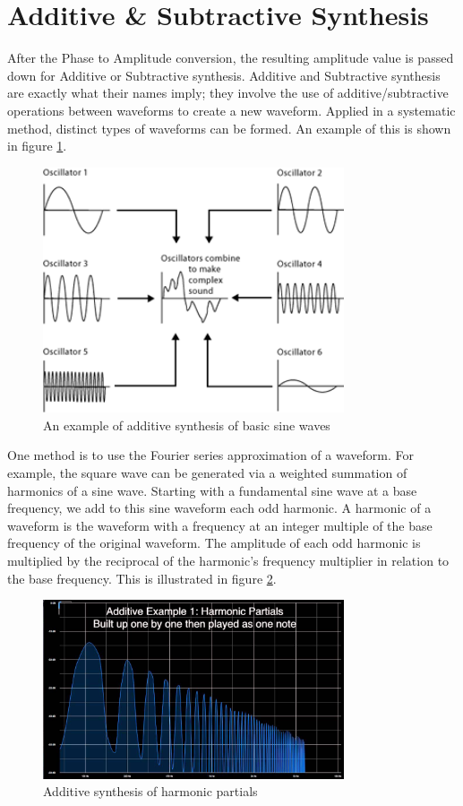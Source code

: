\documentclass[a4paper,12pt]{report}
\begin{document}
\section{Additive \& Subtractive Synthesis}
\label{sec:addsubsynthesis}
After the Phase to Amplitude conversion, the resulting amplitude value is passed down for Additive or Subtractive synthesis. Additive and Subtractive synthesis are exactly what their names imply; they involve the use of additive/subtractive operations between waveforms to create a new waveform. Applied in a systematic method, distinct types of waveforms can be formed. An example of this is shown in figure \ref{fig:additivesynthesis}.

\begin{figure}
    \centering
    \includegraphics[width=24em]{AdditiveSynthesis.png}
    \caption{An example of additive synthesis of basic sine waves}
    \label{fig:additivesynthesis}
\end{figure}

One method is to use the Fourier series approximation of a waveform. For example, the square wave can be generated via a weighted summation of harmonics of a sine wave. Starting with a fundamental sine wave at a base frequency, we add to this sine waveform each odd harmonic. A harmonic of a waveform is the waveform with a frequency at an integer multiple of the base frequency of the original waveform. The amplitude of each odd harmonic is multiplied by the reciprocal of the harmonic's frequency multiplier in relation to the base frequency. This is illustrated in figure \ref{fig:AdditiveSynthesisbyHarmonics}.

\begin{figure}
    \centering
    \includegraphics[width=24em]{AdditiveSynthesisbyHarmonics.jpg}
    \caption{Additive synthesis of harmonic partials}
    \label{fig:AdditiveSynthesisbyHarmonics}
\end{figure}
\end{document}
